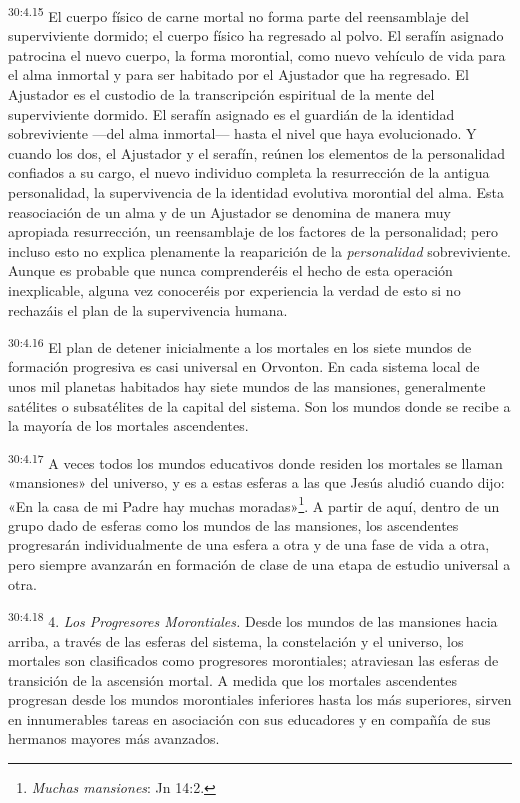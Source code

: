 \par
\textsuperscript{30:4.15} El cuerpo físico de carne mortal no forma parte del reensamblaje del superviviente dormido; el cuerpo físico ha regresado al polvo. El serafín asignado patrocina el nuevo cuerpo, la forma morontial, como nuevo vehículo de vida para el alma inmortal y para ser habitado por el Ajustador que ha regresado. El Ajustador es el custodio de la transcripción espiritual de la mente del superviviente dormido. El serafín asignado es el guardián de la identidad sobreviviente ---del alma inmortal--- hasta el nivel que haya evolucionado. Y cuando los dos, el Ajustador y el serafín, reúnen los elementos de la personalidad confiados a su cargo, el nuevo individuo completa la resurrección de la antigua personalidad, la supervivencia de la identidad evolutiva morontial del alma. Esta reasociación de un alma y de un Ajustador se denomina de manera muy apropiada resurrección, un reensamblaje de los factores de la personalidad; pero incluso esto no explica plenamente la reaparición de la \textit{personalidad} sobreviviente. Aunque es probable que nunca comprenderéis el hecho de esta operación inexplicable, alguna vez conoceréis por experiencia la verdad de esto si no rechazáis el plan de la supervivencia humana.

\par
\textsuperscript{30:4.16} El plan de detener inicialmente a los mortales en los siete mundos de formación progresiva es casi universal en Orvonton. En cada sistema local de unos mil planetas habitados hay siete mundos de las mansiones, generalmente satélites o subsatélites de la capital del sistema. Son los mundos donde se recibe a la mayoría de los mortales ascendentes.

\par
\textsuperscript{30:4.17} A veces todos los mundos educativos donde residen los mortales se llaman «mansiones» del universo, y es a estas esferas a las que Jesús aludió cuando dijo: «En la casa de mi Padre hay muchas moradas»\footnote{\textit{Muchas mansiones}: Jn 14:2.}. A partir de aquí, dentro de un grupo dado de esferas como los mundos de las mansiones, los ascendentes progresarán individualmente de una esfera a otra y de una fase de vida a otra, pero siempre avanzarán en formación de clase de una etapa de estudio universal a otra.

\par
\textsuperscript{30:4.18} 4. \textit{Los Progresores Morontiales.} Desde los mundos de las mansiones hacia arriba, a través de las esferas del sistema, la constelación y el universo, los mortales son clasificados como progresores morontiales; atraviesan las esferas de transición de la ascensión mortal. A medida que los mortales ascendentes progresan desde los mundos morontiales inferiores hasta los más superiores, sirven en innumerables tareas en asociación con sus educadores y en compañía de sus hermanos mayores más avanzados.

